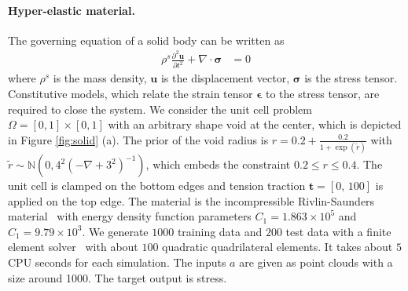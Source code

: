 \documentclass{article}
\newcommand{\N}{\mathbb{N}}
\begin{document}
\paragraph{Hyper-elastic material.} The governing equation of a solid body can be written as
\begin{align*}
\rho^s \frac{\partial^2 \bm{u}}{\partial t^2} + \nabla \cdot \bm{\sigma} &= 0
\end{align*}
where $\rho^s$ is the mass density, $\bm{u}$ is the displacement vector, $\bm{\sigma}$ is the stress tensor. Constitutive models, which relate the strain tensor $\bm{\epsilon}$ to the stress tensor, are required to close the system. 
We consider the unit cell problem $\Omega = [0,1]\times[0,1]$ with an arbitrary shape void at the center, which is depicted in Figure \ref{fig:solid} (a). The prior of the void radius is $r = 0.2 + \frac{0.2}{1 + \exp(\tilde{r})}$ with $\tilde{r} \sim \N(0, 4^2(-\nabla + 3^2)^{-1})$, which embeds the constraint $0.2 \leq r \leq 0.4$. 
%
The unit cell is clamped on the bottom edges and tension traction $\bm{t} = [0,\,100]$ is applied on the top edge.
The material is the incompressible Rivlin-Saunders material~\cite{pascon2019large} with energy density function parameters $C_1 = 1.863\times10^5$ and $C_1 = 9.79\times10^3$.
We generate $1000$ training data and $200$ test data with a finite element solver~\cite{huang2020learning} with about $100$ quadratic quadrilateral elements.
It takes about $5$ CPU seconds for each simulation.
The inputs $a$ are given as point clouds with a size around 1000. The target output is stress.
\end{document}
